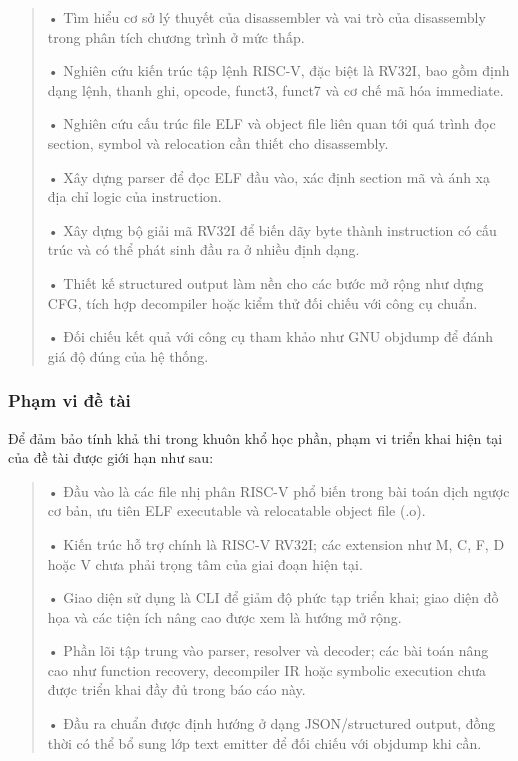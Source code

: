 \documentclass[
]{article}
\begin{document}
\begin{quote}
• Tìm hiểu cơ sở lý thuyết của disassembler và vai trò của disassembly
trong phân tích chương trình ở mức thấp.

• Nghiên cứu kiến trúc tập lệnh RISC-V, đặc biệt là RV32I, bao gồm định
dạng lệnh, thanh ghi, opcode, funct3, funct7 và cơ chế mã hóa immediate.

• Nghiên cứu cấu trúc file ELF và object file liên quan tới quá trình
đọc section, symbol và relocation cần thiết cho disassembly.

• Xây dựng parser để đọc ELF đầu vào, xác định section mã và ánh xạ địa
chỉ logic của instruction.

• Xây dựng bộ giải mã RV32I để biến dãy byte thành instruction có cấu
trúc và có thể phát sinh đầu ra ở nhiều định dạng.

• Thiết kế structured output làm nền cho các bước mở rộng như dựng CFG,
tích hợp decompiler hoặc kiểm thử đối chiếu với công cụ chuẩn.

• Đối chiếu kết quả với công cụ tham khảo như GNU objdump để đánh giá độ
đúng của hệ thống.
\end{quote}

\hypertarget{phux1ea1m-vi-ux111ux1ec1-tuxe0i}{%
\subsubsection{\texorpdfstring{ Phạm vi đề
tài}{ Phạm vi đề tài}}\label{phux1ea1m-vi-ux111ux1ec1-tuxe0i}}

Để đảm bảo tính khả thi trong khuôn khổ học phần, phạm vi triển khai
hiện tại của đề tài được giới hạn như sau:

\begin{quote}
• Đầu vào là các file nhị phân RISC-V phổ biến trong bài toán dịch ngược
cơ bản, ưu tiên ELF executable và relocatable object file (.o).

• Kiến trúc hỗ trợ chính là RISC-V RV32I; các extension như M, C, F, D
hoặc V chưa phải trọng tâm của giai đoạn hiện tại.

• Giao diện sử dụng là CLI để giảm độ phức tạp triển khai; giao diện đồ
họa và các tiện ích nâng cao được xem là hướng mở rộng.

• Phần lõi tập trung vào parser, resolver và decoder; các bài toán nâng
cao như function recovery, decompiler IR hoặc symbolic execution chưa
được triển khai đầy đủ trong báo cáo này.

• Đầu ra chuẩn được định hướng ở dạng JSON/structured output, đồng thời
có thể bổ sung lớp text emitter để đối chiếu với objdump khi cần.
\end{quote}
\end{document}
